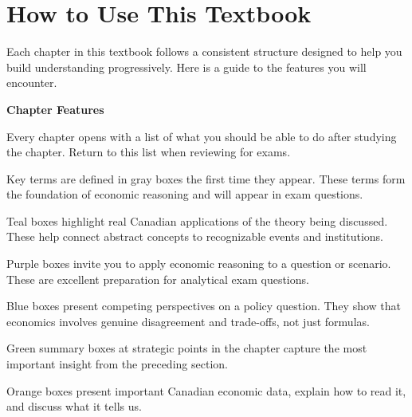 \documentclass[12pt,twoside,openright]{book}
\theoremstyle{definition}
\begin{document}
\chapter*{How to Use This Textbook}

\noindent Each chapter in this textbook follows a consistent structure designed to help you build
understanding progressively. Here is a guide to the features you will encounter.

\vspace{10pt}
\noindent\textbf{Chapter Features}

\begin{description}[leftmargin=2cm,style=nextline]

\item[\textcolor{unbcgreen}{\bfseries Learning Objectives}]
Every chapter opens with a list of what you should be able to do after studying the chapter.
Return to this list when reviewing for exams.

\item[\textcolor{unbcgreen}{\bfseries Definition Boxes}]
Key terms are defined in gray boxes the first time they appear. These terms form the
foundation of economic reasoning and will appear in exam questions.

\item[\textcolor{exampleteal}{\bfseries Canadian Example Boxes}]
Teal boxes highlight real Canadian applications of the theory being discussed. These help
connect abstract concepts to recognizable events and institutions.

\item[\textcolor{thinkpurple}{\bfseries Think Like an Economist}]
Purple boxes invite you to apply economic reasoning to a question or scenario. These are
excellent preparation for analytical exam questions.

\item[\textcolor{policyblue}{\bfseries Policy Debate Boxes}]
Blue boxes present competing perspectives on a policy question. They show that economics
involves genuine disagreement and trade-offs, not just formulas.

\item[\textcolor{unbcgreen}{\bfseries Key Takeaway}]
Green summary boxes at strategic points in the chapter capture the most important insight
from the preceding section.

\item[\textcolor{dataorange}{\bfseries Data Spotlight}]
Orange boxes present important Canadian economic data, explain how to read it, and
discuss what it tells us.

\end{description}
\end{document}
